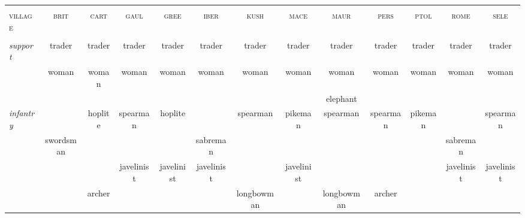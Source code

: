 \documentclass{article}
\newcommand{\brit}{\textsc{\color{blue} brit}}
\newcommand{\cart}{\textsc{\color{blue} cart}}
\newcommand{\gaul}{\textsc{\color{blue} gaul}}
\newcommand{\gree}{\textsc{\color{blue} gree}}
\newcommand{\iber}{\textsc{\color{blue} iber}}
\newcommand{\kush}{\textsc{\color{blue} kush}}
\newcommand{\mace}{\textsc{\color{blue} mace}}
\newcommand{\maur}{\textsc{\color{blue} maur}}
\newcommand{\pers}{\textsc{\color{blue} pers}}
\newcommand{\ptol}{\textsc{\color{blue} ptol}}
\newcommand{\rome}{\textsc{\color{blue} rome}}
\newcommand{\sele}{\textsc{\color{blue} sele}}
\newcommand{\village}{\textsc{\color{blue} village}}
\begin{document}
\begin{landscape}
\footnotesize

\begin{tabular}{l||c|c|c|c||c|c|c|c||c|c|c|c}
\hline
\hline
 &                &                &                &                &                &                &                &                &                &                &                &                \\
\village %
 & \brit          & \cart          & \gaul          & \gree          & \iber          & \kush          & \mace          & \maur          & \pers          & \ptol          & \rome          & \sele          \\
 &                &                &                &                &                &                &                &                &                &                &                &                \\
\hline
\hline\textit{support}
 & trader         & trader         & trader         & trader         & trader         & trader         & trader         & trader         & trader         & trader         & trader         & trader         \\
 & woman          & woman          & woman          & woman          & woman          & woman          & woman          & woman          & woman          & woman          & woman          & woman          \\
 &                &                &                &                &                &                &                & elephant       &                &                &                &                \\
\hline\textit{infantry}
 &                & hoplite        & spearman       & hoplite        &                & spearman       & pikeman        & spearman       & spearman       & pikeman        &                & spearman       \\
 & swordsman      &                &                &                & sabreman       &                &                &                &                &                & sabreman       &                \\
 &                &                & javelinist     & javelinist     & javelinist     &                & javelinist     &                &                &                & javelinist     & javelinist     \\
 &                & archer         &                &                &                & longbowman     &                & longbowman     & archer         &                &                &                \\

\end{tabular}
\end{landscape}
\end{document}
